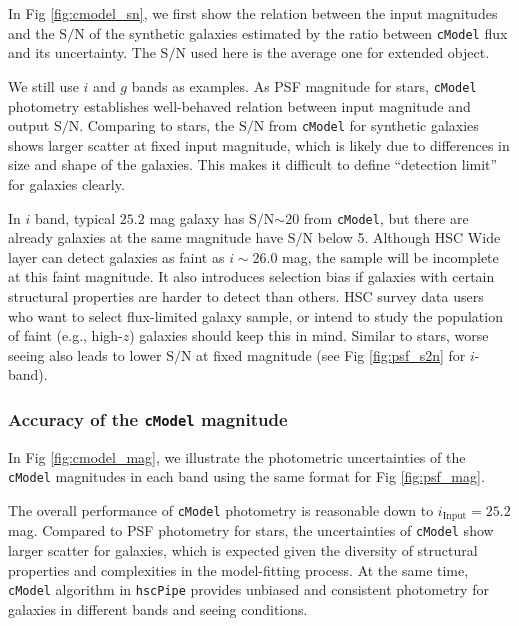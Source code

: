 \documentclass[useamsfonts]{pasj01}
\def\hscpipe{\texttt{hscPipe}}
\def\cmodel{\texttt{cModel}}
\def\s2n{{$\mathrm{S}/\mathrm{N}$}}
\begin{document}
    In Fig \ref{fig:cmodel_sn}, we first show the relation between the input
    magnitudes and the \s2n{} of the synthetic galaxies estimated by the ratio
    between \cmodel{} flux and its uncertainty.
    The \s2n{} used here is the average one for extended object.

    We still use $i$ and $g$ bands as examples.
    As PSF magnitude for stars, \cmodel{} photometry establishes well-behaved relation 
    between input magnitude and output \s2n{}. 
    Comparing to stars, the \s2n{} from \cmodel{} for synthetic galaxies shows larger
    scatter at fixed input magnitude, which is likely due to differences in size and 
    shape of the galaxies.
    This makes it difficult to define ``detection limit'' for galaxies clearly.
    
    In $i$ band, typical $25.2$ mag galaxy has \s2n{}${\sim}20$ from \cmodel{}, but 
    there are already galaxies at the same magnitude have \s2n{} below 5.
    Although HSC Wide layer can detect galaxies as faint as $i{\sim}26.0$ mag, the 
    sample will be incomplete at this faint magnitude.
    It also introduces selection bias if galaxies with certain structural properties 
    are harder to detect than others.
    HSC survey data users who want to select flux-limited galaxy sample,
    or intend to study the population of faint (e.g., high-$z$) galaxies should
    keep this in mind.
    Similar to stars, worse seeing also leads to lower \s2n{} at fixed magnitude 
    (see Fig \ref{fig:psf_s2n} for $i$-band).

\subsubsection{Accuracy of the \cmodel{} magnitude}

    In Fig \ref{fig:cmodel_mag}, we illustrate the photometric uncertainties of the
    \cmodel{} magnitudes in each band using the same format for Fig \ref{fig:psf_mag}.

    The overall performance of \cmodel{} photometry is reasonable down to 
    $i_{\mathrm{Input}}=25.2$ mag.
    Compared to PSF photometry for stars, the uncertainties of \cmodel{} show larger 
    scatter for galaxies, which is expected given the diversity of structural 
    properties and complexities in the model-fitting process.
    At the same time, \cmodel{} algorithm in \hscpipe{} provides unbiased and consistent 
    photometry for galaxies in different bands and seeing conditions.
\end{document}
